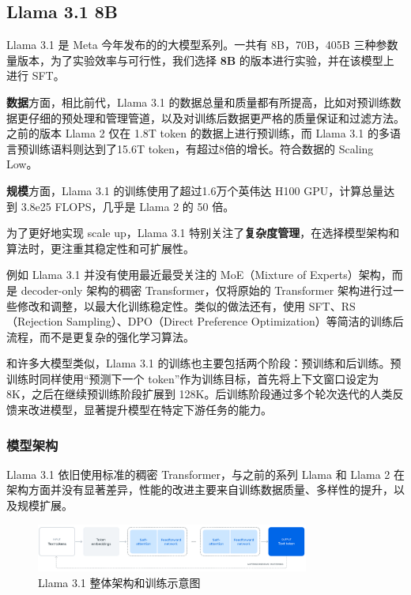 \subsection{Llama 3.1 8B}

Llama 3.1 是 Meta 今年发布的的大模型系列。一共有 8B，70B，405B 三种参数量版本，为了实验效率与可行性，我们选择 \textbf{8B} 的版本进行实验，并在该模型上进行 SFT。

\textbf{数据}方面，相比前代，Llama 3.1 的数据总量和质量都有所提高，比如对预训练数据更仔细的预处理和管理管道，以及对训练后数据更严格的质量保证和过滤方法。之前的版本 Llama 2 仅在 1.8T token 的数据上进行预训练，而 Llama 3.1 的多语言预训练语料则达到了15.6T token，有超过8倍的增长。符合数据的 Scaling Low。

\textbf{规模}方面，Llama 3.1 的训练使用了超过1.6万个英伟达 H100 GPU，计算总量达到 3.8e25 FLOPS，几乎是 Llama 2 的 50 倍。

为了更好地实现 scale up，Llama 3.1 特别关注了\textbf{复杂度管理}，在选择模型架构和算法时，更注重其稳定性和可扩展性。

例如 Llama 3.1 并没有使用最近最受关注的 MoE（Mixture of Experts）架构，而是 decoder-only 架构的稠密 Transformer，仅将原始的 Transformer 架构进行过一些修改和调整，以最大化训练稳定性。类似的做法还有，使用 SFT、RS（Rejection Sampling）、DPO（Direct Preference Optimization）等简洁的训练后流程，而不是更复杂的强化学习算法。

和许多大模型类似，Llama 3.1 的训练也主要包括两个阶段：预训练和后训练。预训练时同样使用``预测下一个 token''作为训练目标，首先将上下文窗口设定为 8K，之后在继续预训练阶段扩展到 128K。后训练阶段通过多个轮次迭代的人类反馈来改进模型，显著提升模型在特定下游任务的能力。

\subsubsection{模型架构}

Llama 3.1 依旧使用标准的稠密 Transformer，与之前的系列 Llama 和 Llama 2 在架构方面并没有显著差异，性能的改进主要来自训练数据质量、多样性的提升，以及规模扩展。
\begin{figure}[htbp]
    \centering
    \includegraphics[width=0.8\textwidth]{images/architecture.png}
    \caption{Llama 3.1 整体架构和训练示意图}
\end{figure}

